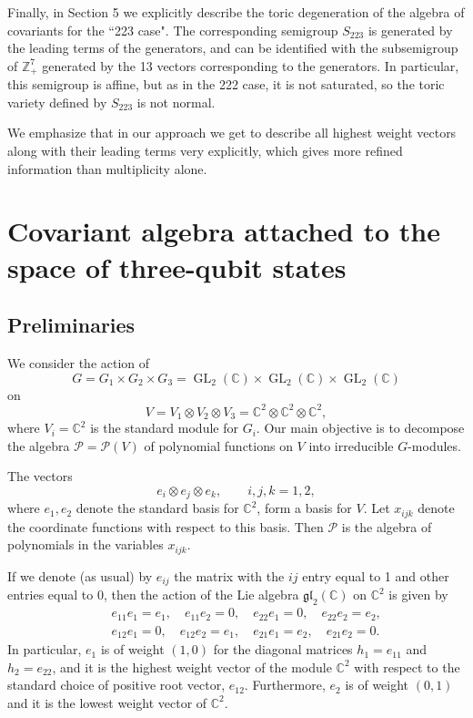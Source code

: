 \documentclass[reqno,11pt]{amsart}
\theoremstyle{remark}
\theoremstyle{definition}
\numberwithin{equation}{section}
\newcommand\GL{\operatorname{GL}}
\newcommand{\frgl}{\mathfrak{gl}}
\newcommand{\bbC}{\mathbb{C}}
\newcommand{\bbZ}{\mathbb{Z}}
\newcommand{\Pol}{\mathcal{P}}
\begin{document}
Finally, in Section 5 we explicitly describe the toric degeneration of the algebra of covariants for the ``223 case". The corresponding semigroup $S_{223}$ is generated by the leading terms of the generators, and can be identified with the subsemigroup of $\bbZ_+^7$ generated by the 13 vectors corresponding to the generators. In particular, this semigroup is affine, but as in the 222 case, it is not saturated,
so the toric variety defined by $S_{223}$ is not normal.


We emphasize that in our approach we get to describe all highest weight vectors along with their leading terms very explicitly, which gives more refined information than multiplicity alone.






\section{Covariant algebra attached to the space of three-qubit states}

\subsection{Preliminaries} We consider the action of 
\[
G=G_1\times G_2\times G_3=\GL_2(\bbC)\times \GL_2(\bbC)\times\GL_2(\bbC)
\]
on 
\[
V=V_1\otimes V_2\otimes V_3=\bbC^2\otimes\bbC^2\otimes\bbC^2,
\]
where $V_i=\bbC^2$ is the standard module for $G_i$.
Our main objective is to decompose the algebra  $\Pol=\Pol(V)$ of polynomial functions on $V$ into irreducible $G$-modules.

The vectors
\[
e_i\otimes e_j\otimes e_k,\qquad i,j,k=1,2,
\]
where $e_1,e_2$ denote the standard basis for $\bbC^2$, form a basis for $V$. Let $x_{ijk}$ denote the coordinate functions with respect to this basis. Then $\Pol$ is the algebra of polynomials in the variables $x_{ijk}$. 

If we denote (as usual) by $e_{ij}$ the matrix with the $ij$ entry equal to 1 and other entries equal to 0, then the action of the Lie algebra $\frgl_2(\bbC)$ on $\bbC^2$ is given by
\begin{eqnarray*}
&& e_{11}e_1=e_1,\quad e_{11}e_2=0,\quad e_{22}e_1=0,\quad e_{22}e_2=e_2,\\
&& e_{12}e_1=0,\quad e_{12}e_2=e_1,\quad e_{21}e_1=e_2,\quad e_{21}e_2=0.
\end{eqnarray*}
In particular, $e_1$ is of weight $(1,0)$ for the diagonal matrices $h_1=e_{11}$ and $h_2=e_{22}$, and it is the highest weight vector of the module $\bbC^2$ with respect to the standard choice of positive root vector, $e_{12}$. Furthermore, $e_2$ is of weight $(0,1)$ and it is the lowest weight vector of $\bbC^2$.
\end{document}
